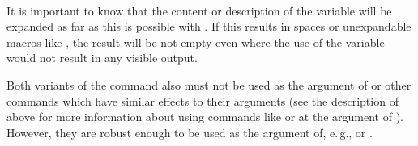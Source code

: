 \begin{Declaration}
  \\
\end{Declaration}
%
%
\begin{Explain}
  It is important to know that the content or description of the
  variable will be expanded as far as this is possible with
  . If this results in spaces or unexpandable macros like
  , the result will be not empty even where the use of
  the variable would not result in any visible output.
  
  Both variants of the command also must not be used as the argument
  of  or other commands
  which have similar effects to their arguments (see the description
  of  above for more information about using
  commands like  or  at the
  argument of ). However, they are robust enough
  to be used as the argument of, e.\,g.,  or
  .
\end{Explain}
%
%



